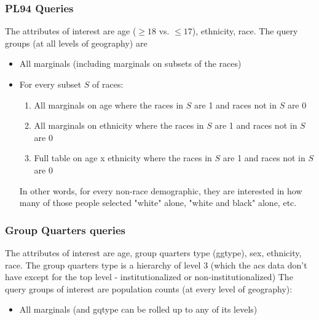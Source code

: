 \documentclass{amsart}
\begin{document}
{\subsubsection{PL94 Queries}
The attributes of interest are age ($\geq 18$ vs. $\leq 17$), ethnicity, race. The query groups (at all levels of geography) are
\begin{itemize}
\item All marginals (including marginals on subsets of the races)
\item For every subset $S$ of races:
\begin{enumerate}
\item All marginals on age where the races in $S$ are 1 and races not in $S$ are $0$
\item All marginals on ethnicity where the races in $S$ are 1 and races not in $S$ are $0$
\item Full table on age x ethnicity where the races in $S$ are 1 and races not in $S$ are $0$
\end{enumerate}
In other words, for every non-race demographic, they are interested in how many of those people selected "white" alone, "white and black" alone, etc.
\end{itemize}
\subsubsection{Group Quarters queries}
The attributes of interest are age, group quarters type (ggtype), sex, ethnicity, race. The group quarters type is a hierarchy of level 3 (which the acs data don't have except for the top level - institutionalized or non-institutionalized)
The query groups of interest are population counts (at every level of geography):
\begin{itemize}
\item All marginals (and gqtype can be rolled up to any of its levels)
\end{itemize}
}
\end{document}
